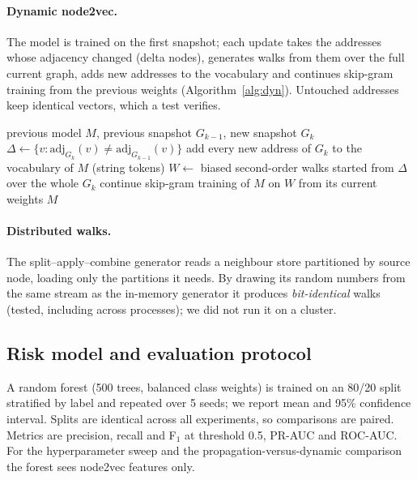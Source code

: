 \paragraph{Dynamic node2vec.} The model is trained on the first snapshot; each update takes the addresses whose adjacency changed (delta nodes), generates walks from them over the full current graph, adds new addresses to the vocabulary and continues skip-gram training from the previous weights (Algorithm~\ref{alg:dyn}). Untouched addresses keep identical vectors, which a test verifies.

\begin{algorithm}[H]
\caption{Dynamic node2vec update (DynN2VChain)}\label{alg:dyn}
\small\singlespacing
\begin{algorithmic}[1]
\Require previous model $M$, previous snapshot $G_{k-1}$, new snapshot $G_k$
\State $\Delta \gets \{v : \mathrm{adj}_{G_k}(v)\neq \mathrm{adj}_{G_{k-1}}(v)\}$ 
\State add every new address of $G_k$ to the vocabulary of $M$ (string tokens)
\State $W \gets$ biased second-order walks started from $\Delta$ over the whole $G_k$
\State continue skip-gram training of $M$ on $W$ from its current weights
\State \Return $M$ 
\end{algorithmic}
\end{algorithm}

\paragraph{Distributed walks.} The split--apply--combine generator reads a neighbour store partitioned by source node, loading only the partitions it needs. By drawing its random numbers from the same stream as the in-memory generator it produces \emph{bit-identical} walks (tested, including across processes); we did not run it on a cluster.

\subsection{Risk model and evaluation protocol}
A random forest (500 trees, balanced class weights) is trained on an 80/20 split stratified by label and repeated over 5 seeds; we report mean and 95\% confidence interval. Splits are identical across all experiments, so comparisons are paired. Metrics are precision, recall and F$_1$ at threshold 0.5, PR-AUC and ROC-AUC. For the hyperparameter sweep and the propagation-versus-dynamic comparison the forest sees node2vec features only.

